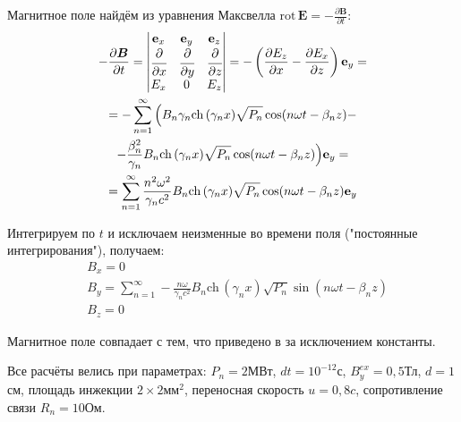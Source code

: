 \documentclass[a4paper,14pt]{extreport} %
\newcommand{\df}[1]{\cfrac{\partial}{\partial #1}}
\newcommand{\dff}[2]{\frac{\partial #1}{\partial #2}}
\renewcommand{\vec}[1]{\bm{#1}}
\newcommand{\ort}[1]{\bm{\mathrm{e}}_#1}
\newcommand{\rot}{\mathrm{rot}\,}
\newcommand{\rotc}[4]{\dff{#1}{#2} - \dff{#3}{#4}}
\renewcommand{\cosh}{\mathrm{ch}\,}
\newcommand{\matrixrotr}[4]{\begin{#4matrix} \ort{x} & \ort{y} & \ort{z} \\ \df{x} & \df{y} & \df{z} \\ #1 & #2 & #3 \end{#4matrix}}
\begin{document}
Магнитное поле найдём из уравнения Максвелла
\(
\rot \vec{E} = -\dff{\vec{B}}{t}
\):
\begin{gather*}
- \dff{\vec{B}}{t}=
\matrixrotr{E_x}{0}{E_z}{v} =
-\left(\rotc{E_z}{x}{E_x}{z}\right) \ort{y} = \\ =
-
\sum\limits_{n=1}^{\infty} \Big( B_n \gamma_n \cosh (\gamma_n x) \sqrt{P_n} \cos (n\omega t - \beta_n z)
- \\ - 
\frac{\beta_n^2}{\gamma_n} B_n \cosh (\gamma_n x)  \sqrt{P_n} \cos (n\omega t - \beta_n z)
\Big)
\ort{y}
= \\ =
\sum\limits_{n=1}^{\infty} \frac{n^2\omega^2}{\gamma_n c^2} B_n \cosh (\gamma_n x) \sqrt{P_n} \cos (n\omega t - \beta_n z)
\ort{y}
\end{gather*}

Интегрируем по $t$ и исключаем неизменные во времени поля ("постоянные интегрирования"), получаем:
\begin{equation}
	\begin{aligned}
	& B_x = 0 \\
	& B_y = \sum\limits_{n=1}^{\infty} -\frac{n\omega}{\gamma_n c^2} B_n \cosh (\gamma_n x) \sqrt{P_n} \sin (n\omega t - \beta_n z) \\
	& B_z = 0
	\end{aligned}
\end{equation}

Магнитное поле совпадает с тем, что приведено в \cite{Silin} за исключением константы.

Все расчёты велись при параметрах: $P_n = 2$МВт, $dt = 10^{-12}$с, $B_y^{ex} = 0{,}5$Тл, $d = 1$см, площадь инжекции $2\times 2\text{мм}^2$, переносная скорость $u = 0{,}8 c$, сопротивление связи $R_n = 10$Ом. 
\end{document}
